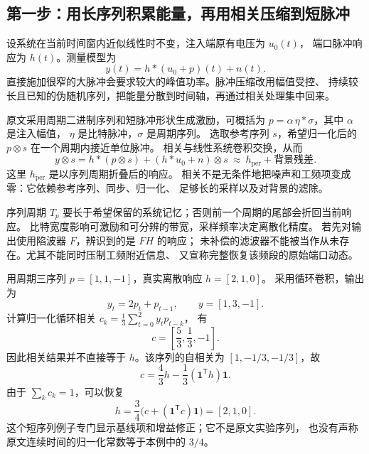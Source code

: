 \subsection{第一步：用长序列积累能量，再用相关压缩到短脉冲}
设系统在当前时间窗内近似线性时不变，注入端原有电压为 $u_0(t)$，
端口脉冲响应为 $h(t)$。测量模型为
\[
 y(t)=h*(u_0+p)(t)+n(t).
\]
直接施加很窄的大脉冲会要求较大的峰值功率。脉冲压缩改用幅值受控、
持续较长且已知的伪随机序列，把能量分散到时间轴，再通过相关处理集中回来。

原文采用周期二进制序列和短脉冲形状生成激励，可概括为
$p=\alpha\,\eta*\sigma$，其中 $\alpha$ 是注入幅值，
$\eta$ 是比特脉冲，$\sigma$ 是周期序列。
选取参考序列 $s$，希望归一化后的 $p\otimes s$ 在一个周期内接近单位脉冲。
相关与线性系统卷积交换，从而
\begin{equation}\label{eq:tb-P5-correlation}
 y\otimes s
 =h*(p\otimes s)+(h*u_0+n)\otimes s
 \ \approx\ h_{\mathrm{per}}+\text{背景残差}.
\end{equation}
这里 $h_{\mathrm{per}}$ 是以序列周期折叠后的响应。
相关不是无条件地把噪声和工频项变成零：它依赖参考序列、同步、归一化、
足够长的采样以及对背景的滤除。

序列周期 $T_p$ 要长于希望保留的系统记忆；否则前一个周期的尾部会折回当前响应。
比特宽度影响可激励和可分辨的带宽，采样频率决定离散化精度。
若先对输出使用陷波器 $F$，辨识到的是 $FH$ 的响应；
未补偿的滤波器不能被当作从未存在。尤其不能同时压制工频附近信息、
又宣称完整恢复该频段的原始端口动态。

\begin{example}
用周期三序列 $p=[1,1,-1]$，真实离散响应 $h=[2,1,0]$。
采用循环卷积，输出为
\[
 y_t=2p_t+p_{t-1},\qquad y=[1,3,-1].
\]
计算归一化循环相关 $c_k=\frac13\sum_{t=0}^{2}y_t p_{t-k}$，
有
\[
 c=\left[\frac53,\frac13,-1\right].
\]
因此相关结果并不直接等于 $h$。该序列的自相关为
$[1,-1/3,-1/3]$，故
\[
 c=\frac43h-\frac13(\mathbf1^\mathsf Th)\mathbf1.
\]
由于 $\sum_k c_k=1$，可以恢复
\[
 h=\frac34\bigl(c+(\mathbf1^\mathsf Tc)\mathbf1\bigr)=[2,1,0].
\]
这个短序列例子专门显示基线项和增益修正；它不是原文实验序列，
也没有声称原文连续时间的归一化常数等于本例中的 $3/4$。
\end{example}

